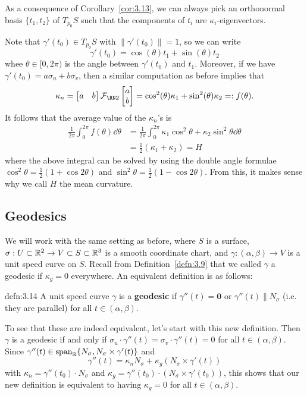 As a consequence of Corollary~\ref{cor:3.13}, we can always pick an orthonormal 
basis $\{t_1, t_2\}$ of $T_{p_0}S$ such that the components of $t_i$ are 
$\kappa_i$-eigenvectors. 

Note that $\gamma'(t_0) \in T_{p_0}S$ with $\|\gamma'(t_0)\| = 1$, so we 
can write 
\[ \gamma'(t_0) = \cos(\theta) t_1 + \sin(\theta) t_2 \] 
whee $\theta \in [0, 2\pi)$ is the angle between $\gamma'(t_0)$ and $t_1$. 
Moreover, if we have $\gamma'(t_0) = a\sigma_u + b\sigma_v$, then a similar 
computation as before implies that 
\[ \kappa_n = \begin{bmatrix} a & b \end{bmatrix} \SFF \begin{bmatrix}
    a \\ b 
\end{bmatrix} = \cos^2(\theta) \kappa_1 + \sin^2(\theta) \kappa_2 =: f(\theta). \] 
It follows that the average value of the $\kappa_n$'s is 
\begin{align*} 
    \frac{1}{2\pi} \int_0^{2\pi} f(\theta)\dd\theta 
    &= \frac{1}{2\pi} \int_0^{2\pi} \kappa_1 \cos^2\theta + \kappa_2 \sin^2\theta \dd\theta \\ 
    &= \frac12 (\kappa_1 + \kappa_2) = H
\end{align*}
where the above integral can be solved by using the double angle formulae 
$\cos^2\theta = \frac12(1+\cos2\theta)$ and $\sin^2\theta = \frac12(1-\cos2\theta)$. 
From this, it makes sense why we call $H$ the mean curvature. 

\subsection{Geodesics} \label{subsec:3.5}
We will work with the same setting as before, where $S$ is a surface, 
$\sigma : U \subset \mathbb{R}^2 \to V \subset S \subset \mathbb{R}^3$ is a smooth 
coordinate chart, and $\gamma : (\alpha, \beta) \to V$ is a unit speed 
curve on $S$. Recall from Definition~\ref{defn:3.9} that we called $\gamma$ a 
geodesic if $\kappa_g = 0$ everywhere. An equivalent definition is as follows: 

\begin{defn}{defn:3.14}
    A unit speed curve $\gamma$ is a {\bf geodesic} if $\gamma''(t) = \mathbf 0$ 
    or $\gamma''(t) \parallel N_\sigma$ (i.e. they are parallel) 
    for all $t \in (\alpha, \beta)$.
\end{defn}\vspace{-0.25cm} 

To see that these are indeed equivalent, let's start with this new definition. 
Then $\gamma$ is a geodesic if and only if $\sigma_u \cdot \gamma''(t) = 
\sigma_v \cdot \gamma''(t) = 0$ for all $t \in (\alpha, \beta)$. Since 
$\gamma''(t) \in \operatorname{span}_{\mathbb{R}}\{N_\sigma, N_\sigma \times \gamma'(t)\}$ 
and 
\[ \gamma''(t) = \kappa_n N_\sigma + \kappa_g (N_\sigma \times \gamma'(t)) \] 
with $\kappa_n = \gamma''(t_0) \cdot N_\sigma$ and 
$\kappa_g = \gamma''(t_0) \cdot (N_\sigma \times \gamma'(t_0))$, 
this shows that our new definition is equivalent to having $\kappa_g = 0$ 
for all $t \in (\alpha, \beta)$.

